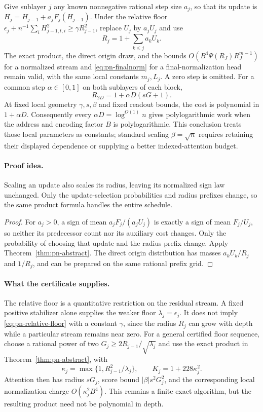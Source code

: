 \begin{corollary}
\label{cor:pn-stepsizes}
Give sublayer $j$ any known nonnegative rational step size $a_j$, so that
its update is $H_j=H_{j-1}+a_jF_j(H_{j-1})$. Under the relative floor
$\epsilon_j+n^{-1}\sum_iH_{j-1,t,i}^2\ge\gamma R_{j-1}^2$, replace
$U_j$ by $a_jU_j$ and use
\[
 R_j=1+\sum_{k\le j}a_kU_k.
\]
The exact product, the direct origin draw, and the bounds
$O(B^4\Psi(R_J)R_J^{m-1})$ for a normalized stream and
\eqref{eq:pn-finalnorm} for a final-normalization head remain valid,
with the same local constants $m_j,L_j$. A zero step is omitted.
For a common step $\alpha\in[0,1]$ on both sublayers of each block,
\[
 R_{2D}=1+\alpha D(sG+1).
\]
At fixed local geometry $\gamma,s,\beta$ and fixed readout bounds, the
cost is polynomial in $1+\alpha D$. Consequently every
$\alpha D=\log^{O(1)}n$ gives polylogarithmic work when the address and
encoding factor $B$ is polylogarithmic. This conclusion treats those
local parameters as constants; standard scaling $\beta=\sqrt n$
requires retaining their displayed dependence or supplying a better
indexed-attention budget.
\end{corollary}
\paragraph{Proof idea.}
Scaling an update also scales its radius, leaving its normalized
sign law unchanged. Only the update-selection probabilities and radius
prefixes change, so the same product formula handles the entire schedule.

\begin{proof}
For $a_j>0$, a sign of mean $a_jF_j/(a_jU_j)$ is exactly a sign of
mean $F_j/U_j$, so neither its predecessor count nor its auxiliary
cost changes. Only the probability of choosing that update and the
radius prefix change. Apply Theorem~\ref{thm:pn-abstract}. The direct
origin distribution has masses $a_kU_k/R_j$ and $1/R_j$, and can be
prepared on the same rational prefix grid.
\end{proof}

\paragraph{What the certificate supplies.}
The relative floor is a quantitative restriction on the residual stream.
A fixed positive stabilizer alone supplies the weaker floor
$\lambda_j=\epsilon_j$. It does not imply
\eqref{eq:pn-relative-floor} with a constant $\gamma$, since the radius
$R_j$ can grow with depth while a particular stream remains near zero.
For a general certified floor sequence, choose a rational power of two
$G_j\ge2R_{j-1}/\sqrt{\lambda_j}$ and use the exact product in
Theorem~\ref{thm:pn-abstract}, with
\[
 \kappa_j=\max\{1,R_{j-1}^2/\lambda_j\},\qquad
 K_j=1+228\kappa_j^2.
\]
Attention then has radius $sG_j$, score bound $|\beta|s^2G_j^2$, and the
corresponding local normalization charge $O(\kappa_j^2B^4)$. This remains
a finite exact algorithm, but the resulting product need not be
polynomial in depth.

